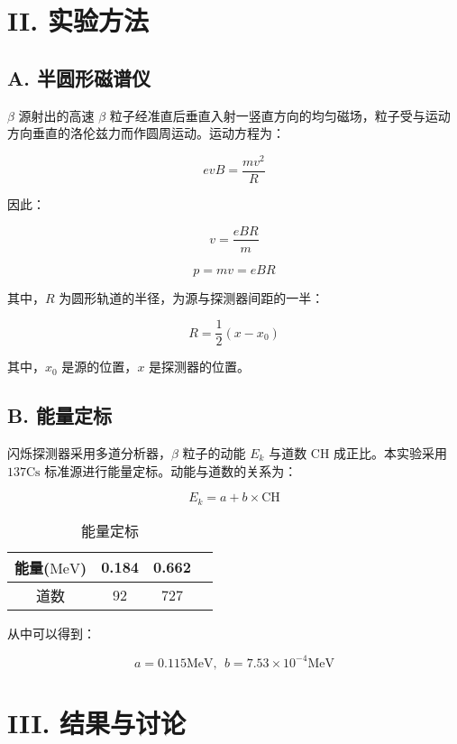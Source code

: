\documentclass[aps,prl,preprint,groupedaddress]{revtex4-2}
\begin{document}
\section{II. 实验方法}

\subsection{A. 半圆形磁谱仪}

$\beta $ 源射出的高速 $\beta$ 粒子经准直后垂直入射一竖直方向的均匀磁场，粒子受与运动方向垂直的洛伦兹力而作圆周运动。运动方程为：

$$
evB = \frac{mv^2}{R}
$$

因此：

$$
v = \frac{eBR}{m}
$$

$$
p = mv = eBR
$$

其中，$R$ 为圆形轨道的半径，为源与探测器间距的一半：

$$
R = \frac{1}{2}(x-x_0)
$$

其中，$x_0$ 是源的位置，$x$ 是探测器的位置。

\subsection{B. 能量定标}

闪烁探测器采用多道分析器，$\beta$ 粒子的动能 $E_k$ 与道数 $\mathrm{CH}$ 成正比。本实验采用 $137\mathrm{Cs} $ 标准源进行能量定标。动能与道数的关系为：

$$
E_k = a+b\times \mathrm{CH}
$$

\begin{table}[htbp] %
	\centering %
	\caption{能量定标} %
	\begin{tabular}{|c|c|c|c|} %
	\hline %
	能量($\mathrm{MeV}$) & 0.184 &0.662 \\ %
	\hline %
	道数 &92 &727 \\ %
	\hline %
	\end{tabular}
\end{table}

从中可以得到：

$$
a = 0.115\mathrm{MeV} ,~~b = 7.53\times 10^{-4} \mathrm{MeV}
$$

\section{III. 结果与讨论}
\end{document}
